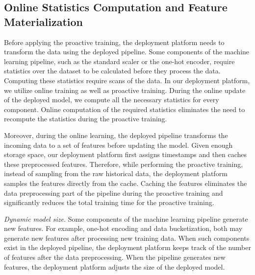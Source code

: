 \subsection{Online Statistics Computation and Feature Materialization}
Before applying the proactive training, the deployment platform needs to transform the data using the deployed pipeline.
Some components of the machine learning pipeline, such as the standard scaler or the one-hot encoder, require statistics over the dataset to be calculated before they process the data.
Computing these statistics require scans of the data.
In our deployment platform, we utilize online training as well as proactive training.
During the online update of the deployed model, we compute all the necessary statistics for every component.
Online computation of the required statistics eliminates the need to recompute the statistics during the proactive training.

Moreover, during the online learning, the deployed pipeline transforms the incoming data to a set of features before updating the model.
Given enough storage space, our deployment platform first assigns timestamps and then caches these preprocessed features.
Therefore, while performing the proactive training, instead of sampling from the raw historical data, the deployment platform samples the features directly from the cache.
Caching the features eliminates the data preprocessing part of the pipeline during the proactive training and significantly reduces the total training time for the proactive training.

\textit{Dynamic model size.}
Some components of the machine learning pipeline generate new features.
For example, one-hot encoding and data bucketization, both may generate new features after processing new training data.
When such components exist in the deployed pipeline, the deployment platform keeps track of the number of features after the data preprocessing.
When the pipeline generates new features, the deployment platform adjusts the size of the deployed model.

